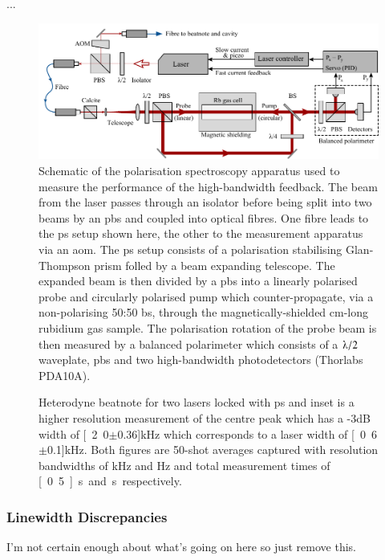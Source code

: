 ...

\begin{figure}
\center
\includegraphics[width=\linewidth]{part1/Figs/ps_two_laser.pdf}
\caption{Schematic of the polarisation spectroscopy apparatus used to measure the performance of the high-bandwidth feedback. The beam from the laser passes through an isolator before being split into two beams by an \gls{pbs} and coupled into optical fibres.
One fibre leads to the \gls{ps} setup shown here, the other to the measurement apparatus via an \gls{aom}.
The \gls{ps} setup consists of a polarisation stabilising Glan-Thompson prism folled by a beam expanding telescope.
The expanded beam is then divided by a \gls{pbs} into a linearly polarised probe and circularly polarised pump which counter-propagate, via a non-polarising 50:50 \gls{bs}, through the magnetically-shielded \unit[15]{cm}-long rubidium gas sample.
The polarisation rotation of the probe beam is then measured by a balanced polarimeter which consists of a $\lambdaup/2$ waveplate, \gls{pbs} and two high-bandwidth photodetectors (Thorlabs PDA10A).}
\label{figure:two_laser_setup}
\end{figure}

\begin{figure}
\center

\caption{Heterodyne beatnote for two lasers locked with \gls{ps} and inset is a higher resolution measurement of the centre peak which has a -3dB width of \unit[2.0$\pm$0.36]{kHz} which corresponds to a laser width of \unit[0.6$\pm$0.1]{kHz}.
Both figures are 50-shot averages captured with resolution bandwidths of \unit[30]{kHz} and \unit[100]{Hz} and total measurement times of \unit[0.5]{s} and \unit[2]{s} respectively.}
\label{figure:two_laser_beatnote}
\end{figure}

\subsubsection{Linewidth Discrepancies}
{\color{red}I'm not certain enough about what's going on here so just remove this.}

